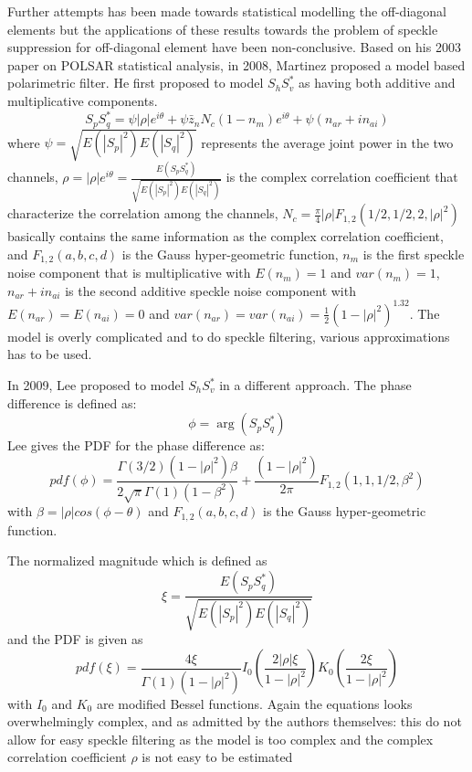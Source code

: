 Further attempts has been made towards statistical modelling the off-diagonal elements but the applications of these results towards the problem of speckle suppression for off-diagonal element have been non-conclusive.
Based on his 2003 paper \cite{Lopez_2003_TGRS} on POLSAR statistical analysis, in 2008, Martinez \cite{Lopez_2008_TGRS} proposed a model based polarimetric filter.
He first proposed to model $S_hS_v^*$ as having both additive and multiplicative components. 
\begin{equation}
S_pS_q^* = \psi |\rho | e^{i \theta} + \psi \bar{z}_n N_c (1-n_m) e^{i \theta} + \psi (n_{ar} + i n_{ai}) 
\end{equation}
where
	$\psi = \sqrt{ E \left( |S_p|^2 \right) E \left( |S_q|^2 \right) }$ represents the average joint power in the two channels, 
	$\rho = |\rho| e^{i \theta} = \frac{E \left( S_pS_q^* \right)}{ \sqrt{ E \left( |S_p|^2 \right) E \left( |S_q|^2 \right) } }$ is the complex correlation coefficient that characterize the correlation among the channels,
	$N_c = \frac{\pi}{4} |\rho| F_{1,2} ( 1/2,1/2,2,|\rho|^2 )$ basically contains the same information as the complex correlation coefficient, and 
	$F_{1,2} ( a,b,c,d )$ is the Gauss hyper-geometric function,
	$n_m$ is the first speckle noise component that is multiplicative with $E(n_m)=1$ and $var(n_m)=1$,
	$n_{ar} + i n_{ai}$ is the second additive speckle noise component with $E(n_{ar}) = E(n_{ai}) = 0$ and $var(n_{ar}) = var(n_{ai}) = \frac{1}{2} (1-|\rho|^2)^{1.32}$.
The model is overly complicated and to do speckle filtering, various approximations has to be used.

In 2009, Lee \cite{Lee_CRCPress_2009} proposed to model $S_hS_v^*$ in a different approach.
The phase difference is defined as:
\begin{equation}
\phi = \arg{ \left( S_pS_q^* \right) }
\end{equation}
Lee gives the PDF for the phase difference as:
\begin{equation}
pdf(\phi) = \frac{\Gamma(3/2) (1-|\rho|^2) \beta}{2 \sqrt{\pi} \Gamma(1) (1-\beta^2)} + \frac{(1-|\rho|^2)}{2 \pi} F_{1,2}(1,1,1/2,\beta^2)
\end{equation}
with
	$\beta = |\rho| cos(\phi-\theta)$ and
	$F_{1,2} ( a,b,c,d )$ is the Gauss hyper-geometric function.

The normalized magnitude which is defined as
\begin{equation}
\xi = \frac{E \left( S_pS_q^* \right)}{\sqrt{ E \left( |S_p|^2 \right) E \left( |S_q|^2 \right) }}
\end{equation}
and the PDF is given as
\begin{equation}
pdf(\xi) = \frac{4\xi}{\Gamma(1)(1-|\rho|^2)} I_0 \left( \frac{2 |\rho| \xi}{1-|\rho|^2} \right) K_0 \left(  \frac{2 \xi}{1-|\rho|^2} \right)
\end{equation}
with
	$I_0$ and $K_0$ are modified Bessel functions.
Again the equations looks overwhelmingly complex, and as admitted by the authors themselves:
	this do not allow for easy speckle filtering as the model is too complex and 
	the complex correlation coefficient $\rho$ is not easy to be estimated \cite{Lee_CRCPress_2009}

